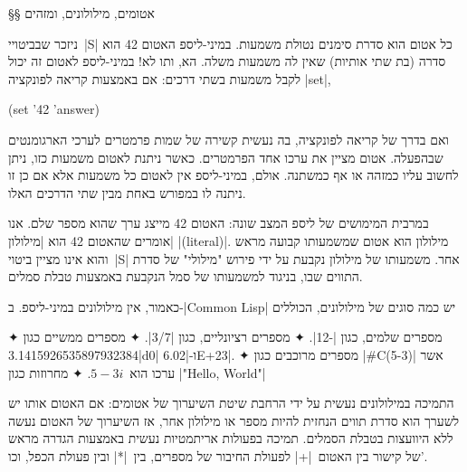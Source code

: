 

§§ אטומים, מילולונים, ומזהים

ניזכר שבביטויי~\E|S| כל אטום הוא סדרת סימנים נטולת משמעות. במיני-ליספ
האטום 42 הוא סדרה (בת שתי אותיות) שאין לה משמעות משלה. הא, ותו לא! במיני-ליספ
לאטום זה יכול לקבל משמעות בשתי דרכים: אם באמצעות קריאה לפונקציה
\E|set|,
\begin{LISP}
(set '42 'answer)
\end{LISP}
ואם בדרך של קריאה לפונקציה, בה נעשית קשירה של שמות פרמטרים לערכי הארגומנטים
שבהפעלה. אטום מציין את ערכו אחד הפרמטרים. כאשר ניתנת לאטום משמעות כזו, ניתן
לחשוב עליו כמזהה או אף כמשתנה. אולם, במיני-ליספ אין לאטום כל משמעות אלא אם כן
זו ניתנה לו במפורש באחת מבין שתי הדרכים האלו.

במרבית המימושים של ליספ המצב שונה: האטום 42 מייצג ערך שהוא מספר שלם. אנו אומרים
שהאטום 42 הוא \ע|מילולון| \E|(literal)|. מילולון הוא אטום שמשמעותו קבועה מראש
והוא אינו מציין ביטוי~\E|S| אחר. משמעותו של מילולון נקבעת על ידי פירוש "מילולי"
של סדרת התווים שבו, בניגוד למשמעותו של סמל הנקבעת באמצעות טבלת סמלים.

כאמור, אין מילולונים במיני-ליספ. ב-\E|Common Lisp| יש כמה סוגים של מילולונים,
הכוללים
\begin{enumerate}
  ✦ מספרים שלמים, כגון \T|-12|.
  ✦ מספרים רציונליים, כגון \T|3/7|.
  ✦ מספרים ממשיים כגון \T|3.1415926535897932384d0| ו-\T|6.02E+23|.
  ✦ מספרים מרוכבים כגון \T|#C(5-3)| אשר ערכו הוא~$5-3i$.
  ✦ מחרוזות כגון \T|"Hello, World"|
\end{enumerate}

התמיכה במילולונים נעשית על ידי הרחבת שיטת השיערוך של אטומים: אם האטום אותו יש
לשערך הוא סדרת תווים הנחזית להיות מספר או מילולון אחר, אז השיערוך של האטום נעשה
ללא היוועצות בטבלת הסמלים. תמיכה בפעולות אריתמטיות נעשית באמצעות הגדרה מראש של
קישור בין האטום~\T|+| לפעולת החיבור של מספרים, בין~\T|*| ובין פעולת הכפל,
וכו'.

